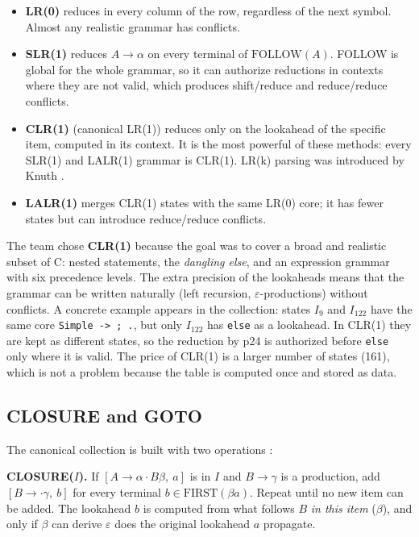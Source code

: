 \documentclass[11pt,letterpaper]{article}
\let\oldsubsection\subsection
\renewcommand{\subsection}{\needspace{6\baselineskip}\oldsubsection}
\newcommand{\tok}[1]{\texttt{#1}}
\begin{document}
\begin{itemize}
  \item \textbf{LR(0)} reduces in every column of the row, regardless of the
        next symbol. Almost any realistic grammar has conflicts.
  \item \textbf{SLR(1)} reduces $A\to\alpha$ on every terminal of
        $\text{FOLLOW}(A)$. FOLLOW is global for the whole grammar, so it can
        authorize reductions in contexts where they are not valid, which
        produces shift/reduce and reduce/reduce conflicts.
  \item \textbf{CLR(1)} (canonical LR(1)) reduces only on the lookahead of the
        specific item, computed in its context. It is the most powerful of these
        methods: every SLR(1) and LALR(1) grammar is CLR(1). LR(k) parsing
        was introduced by Knuth \cite{knuth1965}.
  \item \textbf{LALR(1)} merges CLR(1) states with the same LR(0) core; it has
        fewer states but can introduce reduce/reduce conflicts.
\end{itemize}

The team chose \textbf{CLR(1)} because the goal was to cover a broad and
realistic subset of C: nested statements, the \emph{dangling else}, and an
expression grammar with six precedence levels. The extra precision of the
lookaheads means that the grammar can be written naturally (left recursion,
$\varepsilon$-productions) without conflicts. A concrete example appears in
the collection: states $I_9$ and $I_{122}$ have the same core
\texttt{Simple -> ; .}, but only $I_{122}$ has \tok{else} as a lookahead. In
CLR(1) they are kept as different states, so the reduction by p24 is
authorized before \tok{else} only where it is valid. The price of CLR(1) is a
larger number of states (161), which is not a problem because the table is
computed once and stored as data.

\subsection{CLOSURE and GOTO}
\label{sec:closure}

The canonical collection is built with two operations \cite{aho2006}:

\textbf{CLOSURE($I$).} If $[A\to\alpha\cdot B\beta,\ a]$ is in $I$ and
$B\to\gamma$ is a production, add $[B\to\cdot\gamma,\ b]$ for every terminal
$b\in\text{FIRST}(\beta a)$. Repeat until no new item can be added. The
lookahead $b$ is computed from what follows $B$ \emph{in this item}
($\beta$), and only if $\beta$ can derive $\varepsilon$ does the original
lookahead $a$ propagate.
\end{document}
